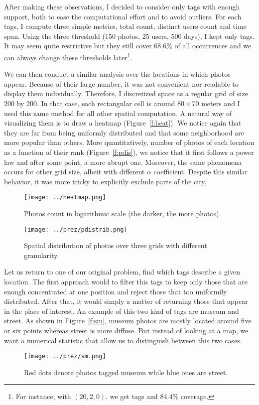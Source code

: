 After making these observations, I decided to consider only tags with enough
support, both to ease the computational effort and to avoid outliers. For each
tags, I compute three simple metrics, total count, distinct users count and
time span. Using the three threshold (150 photos, 25 users, 500 days), I kept
only  tags. It may seem quite restrictive but they still cover
68.6\% of all occurrences and we can always change these thresholds
later\footnote{For instance, with $(20, 2, 0)$, we get  tags
and 84.4\% coverage.}.

We can then conduct a similar analysis over the locations in which photos
appear. Because of their large number, it was not convenient nor readable to
display them individually. Therefore, I discretized space as a regular grid of
size 200 by 200. In that case, each rectangular cell is around $80\times 70$
meters and I used this same method for all other spatial computation. A
natural way of visualizing them is to draw a heatmap (Figure~\vref{f:heat}).
We notice again that they are far from being uniformly distributed and that
some neighborhood are more popular than others. More quantitatively, number of
photos of each location as a function of their rank (Figure~\vref{f:pdis}), we
notice that it first follows a power law and after some point, a more
abrupt one. Moreover, the same phenomena occurs for other grid size, albeit
with different $\alpha$ coefficient. Despite this similar behavior, it was
more tricky to explicitly exclude parts of the city.

\begin{figure}[hbtp]
\texttt{[image: ../heatmap.png]}
\caption{Photos count in logarithmic scale (the darker, the more
photos).\label{f:heat}}
\end{figure}

\begin{figure}[hbtp]
\texttt{[image: ../prez/pdistrib.png]}
\caption{Spatial distribution of photos over three grids with different
granularity.\label{f:pdis}}
\end{figure}

Let us return to one of our original problem, find which tags describe a given
location. The first approach would to filter this  tags to keep
only those that are enough concentrated at one position and reject those that
too uniformily distributed. After that, it would simply a matter of returning
those that appear in the place of interest. An example of this two kind of
tags are \textsf{museum} and \textsf{street}. As shown in Figure~\vref{f:sm},
\textsf{museum} photos are mostly located around five or six points whereas
\textsf{street} is more diffuse. But instead of looking at a map, we want a
numerical statistic that allow us to distinguish between this two cases.

\begin{figure}[hbtp]
\texttt{[image: ../prez/sm.png]}
\caption{Red dots denote photos tagged \textsf{museum} while blue ones are
	\textsf{street}.\label{f:sm}}
\end{figure}
